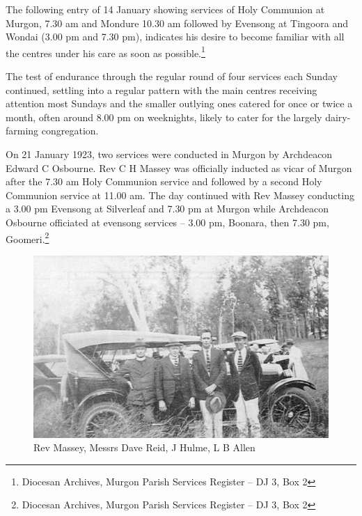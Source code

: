 \smallskip


The following entry of 14 January showing services of Holy Communion at Murgon, 7.30 am and Mondure 10.30 am followed by Evensong at Tingoora and Wondai (3.00 pm and 7.30 pm), indicates his desire to become familiar with all the centres under his care as soon as possible.\footnote{Diocesan Archives, Murgon Parish Services Register -- DJ 3, Box 2}


The test of endurance through the regular round of four services each Sunday continued, settling into a regular pattern with the main centres receiving attention most Sundays and the smaller outlying ones catered for once or twice a month, often around 8.00 pm on weeknights, likely to cater for the largely dairy-farming congregation.



On 21 January 1923, two services were conducted in Murgon by Archdeacon Edward C Osbourne. Rev C H Massey was officially inducted as vicar of Murgon after the 7.30 am Holy Communion service and followed by a second Holy Communion service at 11.00 am. The day continued with Rev Massey conducting a 3.00 pm Evensong at Silverleaf and 7.30 pm at Murgon while Archdeacon Osbourne officiated at evensong services -- 3.00 pm, Boonara, then 7.30 pm, Goomeri.\footnote{Diocesan Archives, Murgon Parish Services Register -- DJ 3, Box 2}








\begin{figure}
\begin{center}
\includegraphics[width=1.\linewidth,center]{../images/masseyRACQ.jpg}
\caption{Rev Massey, Messrs Dave Reid, J Hulme, L B Allen}
\end{center}
\end{figure}




